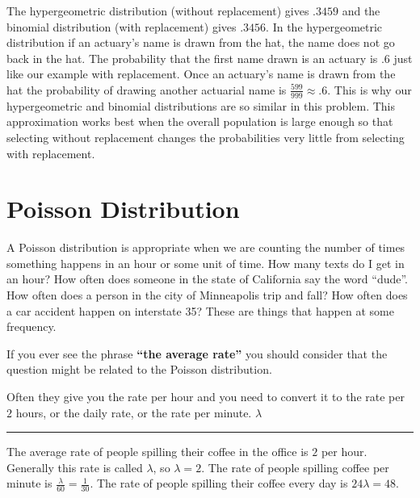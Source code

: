 \documentclass[
]{book}
\theoremstyle{definition}
\theoremstyle{definition}
\theoremstyle{definition}
\theoremstyle{remark}
\let\BeginKnitrBlock\begin \let\EndKnitrBlock\end
\begin{document}
The hypergeometric distribution (without replacement) gives \(.3459\) and the binomial distribution (with replacement) gives \(.3456\). In the hypergeometric distribution if an actuary's name is drawn from the hat, the name does not go back in the hat. The probability that the first name drawn is an actuary is \(.6\) just like our example with replacement. Once an actuary's name is drawn from the hat the probability of drawing another actuarial name is \(\frac{599}{999} \approx.6\). This is why our hypergeometric and binomial distributions are so similar in this problem. This approximation works best when the overall population is large enough so that selecting without replacement changes the probabilities very little from selecting with replacement.

\hypertarget{poisson-distribution}{%
\section{Poisson Distribution}\label{poisson-distribution}}

A Poisson distribution is appropriate when we are counting the number of times something happens in an hour or some unit of time. How many texts do I get in an hour? How often does someone in the state of California say the word ``dude''. How often does a person in the city of Minneapolis trip and fall? How often does a car accident happen on interstate 35? These are things that happen at some frequency.

If you ever see the phrase \textbf{``the average rate''} you should consider that the question might be related to the Poisson distribution.

Often they give you the rate per hour and you need to convert it to the rate per \(2\) hours, or the daily rate, or the rate per minute.
\(\lambda\)

\begin{center}\rule{0.5\linewidth}{0.5pt}\end{center}

\BeginKnitrBlock{example}[Poisson Scaling Rate]
\protect\hypertarget{exm:unnamed-chunk-26}{}{\label{exm:unnamed-chunk-26} {} }The average rate of people spilling their coffee in the office is \(2\) per hour. Generally this rate is called \(\lambda\), so \(\lambda = 2\). The rate of people spilling coffee per minute is \(\frac{\lambda}{60} = \frac{1}{30}\). The rate of people spilling their coffee every day is \(24 \lambda = 48\).
\EndKnitrBlock{example}
\end{document}

